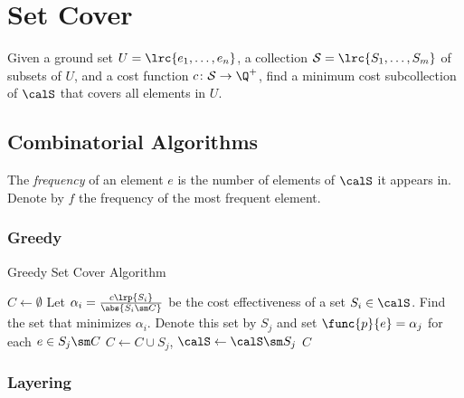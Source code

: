 \section{Set Cover}
\label{sec:set_cover}

\newcommand{\setcover}{\hyperref[def:linear_threshold]{\textsf{Set Cover}}}

\begin{problem}
    Given a ground set $U = \lrc{e_1, \ldots, e_n}$, a collection $\mathcal{S} = \lrc{S_1, \ldots, S_m}$ of subsets of $U$,
    and a cost function $c\colon \mathcal{S} \to \Q^+$, find a minimum cost subcollection of $\calS$ that covers all elements in $U$. 
    \label{prob:set_cover}
\end{problem}

\subsection{Combinatorial Algorithms}
\begin{definition}[Frequency]
    The \emph{frequency} of an element $e$ is the number of elements of $\calS$ it appears in. Denote by $f$ the frequency of the most frequent element. 
    \label{def:set_cover_freq}
\end{definition}

\subsubsection{Greedy}

\begin{algorithm}[!h]
    \caption{Greedy Set Cover Algorithm} \label{alg:set_cover_greedy}
    \begin{algorithmic}[1]
        \State $C \gets \emptyset$
            \State Let $\alpha_i = \frac{c \lrp{S_i}}{\abs{S_i \sm C}}$ be the cost effectiveness of a set $S_i \in \calS$. 
            \State Find the set that minimizes $\alpha_i$. Denote this set by $S_j$ and set $\func{p}{e} = \alpha_j$ for each $e \in S_j \sm C$
            \State $C \gets C \cup S_j$, $\calS \gets \calS \sm S_j$
        \EndWhile
        \State \Return $C$
    \end{algorithmic}
\end{algorithm}

\subsubsection{Layering}